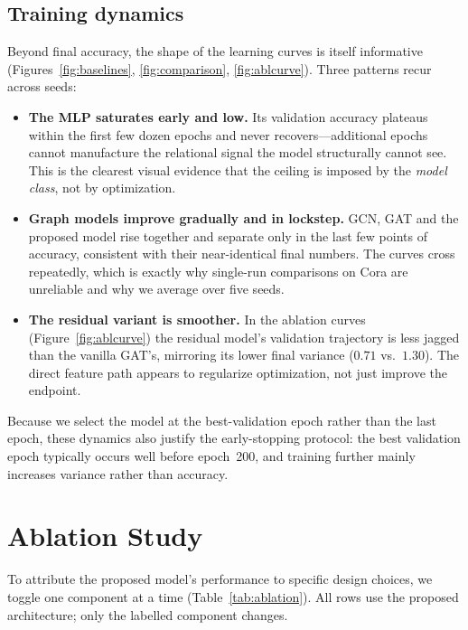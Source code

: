 \documentclass{article}
\begin{document}
\subsection{Training dynamics}
Beyond final accuracy, the shape of the learning curves is itself informative
(Figures~\ref{fig:baselines}, \ref{fig:comparison}, \ref{fig:ablcurve}). Three patterns
recur across seeds:
\begin{itemize}
  \item \textbf{The MLP saturates early and low.} Its validation accuracy plateaus
        within the first few dozen epochs and never recovers---additional epochs cannot
        manufacture the relational signal the model structurally cannot see. This is the
        clearest visual evidence that the ceiling is imposed by the \emph{model class},
        not by optimization.
  \item \textbf{Graph models improve gradually and in lockstep.} GCN, GAT and the
        proposed model rise together and separate only in the last few points of
        accuracy, consistent with their near-identical final numbers. The curves cross
        repeatedly, which is exactly why single-run comparisons on Cora are unreliable
        and why we average over five seeds.
  \item \textbf{The residual variant is smoother.} In the ablation curves
        (Figure~\ref{fig:ablcurve}) the residual model's validation trajectory is less
        jagged than the vanilla GAT's, mirroring its lower final variance
        ($0.71$ vs.\ $1.30$). The direct feature path appears to regularize
        optimization, not just improve the endpoint.
\end{itemize}
Because we select the model at the best-validation epoch rather than the last epoch,
these dynamics also justify the early-stopping protocol: the best validation epoch
typically occurs well before epoch~200, and training further mainly increases variance
rather than accuracy.

\section{Ablation Study}
\label{sec:ablation}

To attribute the proposed model's performance to specific design choices, we toggle
one component at a time (Table~\ref{tab:ablation}). All rows use the proposed
architecture; only the labelled component changes.
\end{document}
